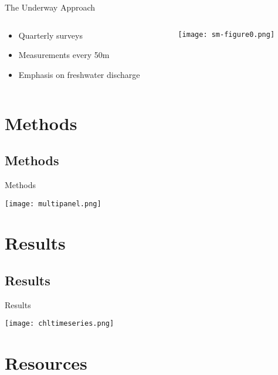\documentclass[compress,noflama,nosectionpages]{beamer}
\begin{document}
\begin{frame}[label=data]{The Underway Approach}
  \begin{columns}
    \begin{column}{5.6cm}
      \begin{itemize}
        \item{Quarterly surveys}\vspace{15pt}\\
        \item{Measurements every 50m}\vspace{15pt}\\         \item{Emphasis on freshwater discharge}
      \end{itemize}
    \end{column}
    \begin{column}{6.8cm}
      \texttt{[image: sm-figure0.png]}
    \end{column}
  \end{columns}
\end{frame}


\section{Methods}
\subsection{Methods}
\begin{frame}{Methods}

\texttt{[image: multipanel.png]}\\

\end{frame}

\section{Results}
\subsection{Results}
\begin{frame}{Results}

\texttt{[image: chltimeseries.png]}\\

\end{frame}

\section{Resources}
\end{document}

